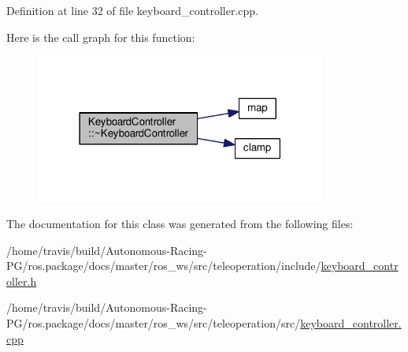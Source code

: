 Definition at line 32 of file keyboard\+\_\+controller.\+cpp.



Here is the call graph for this function\+:
\nopagebreak
\begin{figure}[H]
\begin{center}
\leavevmode
\includegraphics[width=271pt]{class_keyboard_controller_a9791aa6d6fadf77b4ef3e59cdb7d9b1d_cgraph}
\end{center}
\end{figure}




The documentation for this class was generated from the following files\+:\begin{DoxyCompactItemize}
\item 
/home/travis/build/\+Autonomous-\/\+Racing-\/\+P\+G/ros.\+package/docs/master/ros\+\_\+ws/src/teleoperation/include/\hyperlink{keyboard__controller_8h}{keyboard\+\_\+controller.\+h}\item 
/home/travis/build/\+Autonomous-\/\+Racing-\/\+P\+G/ros.\+package/docs/master/ros\+\_\+ws/src/teleoperation/src/\hyperlink{keyboard__controller_8cpp}{keyboard\+\_\+controller.\+cpp}\end{DoxyCompactItemize}
